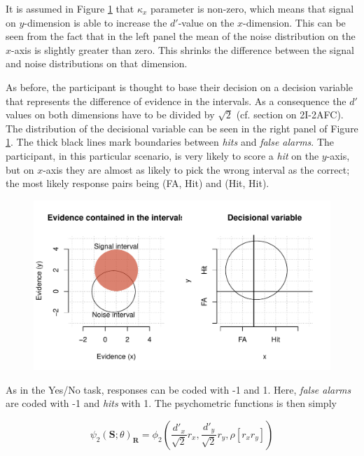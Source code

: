 \documentclass{article}\usepackage{knitr}
\begin{document}
It is assumed in Figure \ref{fig:2I4AFC} that $\kappa_x$ parameter is non-zero, which means that signal on $y$-dimension is able to increase the $d'$-value on the $x$-dimension. This can be seen from the fact that in the left panel the mean of the noise distribution on the $x$-axis is slightly greater than zero. This shrinks the difference between the signal and noise distributions on that dimension.

As before, the participant is thought to base their decision on a decision variable that represents the difference of evidence in the intervals. As a consequence the $d'$ values on both dimensions have to be divided by $\sqrt{2}$ (cf. section on 2I-2AFC). The distribution of the decisional variable can be seen in the right panel of Figure \ref{fig:2I4AFC}. The thick black lines mark boundaries between \textit{hits} and \textit{false alarms}. The participant, in this particular scenario, is very likely to score a \textit{hit} on the $y$-axis, but on $x$-axis they are almost as likely to pick the wrong interval as the correct; the most likely response pairs being (FA, Hit) and (Hit, Hit).

\begin{figure}
\centering
\begin{knitrout}
\color{fgcolor}
\includegraphics[width=\maxwidth]{figure/unnamed-chunk-10-1} 

\end{knitrout}
\caption{}
\label{fig:2I4AFC}
\end{figure}

As in the Yes/No task, responses can be coded with -1 and 1. Here, \textit{false alarms} are coded with -1 and \textit{hits} with 1.  The psychometric functions is then simply

\begin{equation}
\psi_2(\bm{S}; \theta)_{\bm{R}} = \phi_2(\frac{d'_x}{\sqrt{2}}r_x, \frac{d'_y}{\sqrt{2}} r_y, \rho [r_x r_y])
\label{eq:generalPfun2}
\end{equation}
\end{document}
